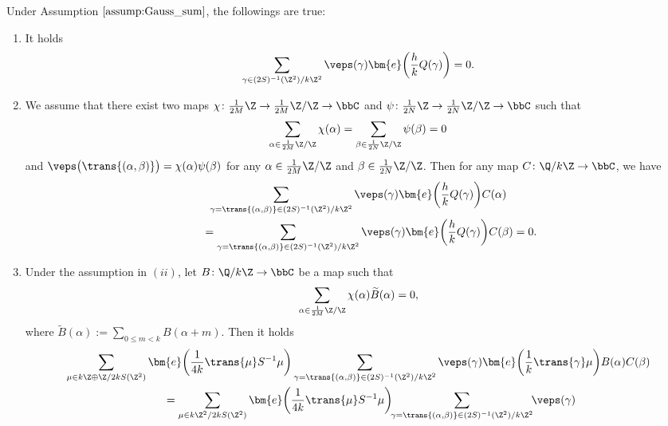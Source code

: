 \begin{prop} \label{prop:Gauss_sum}
	Under Assumption $ \ref{assump:Gauss_sum} $, the followings are true:
	\begin{enumerate}
		\item[$(i)$] %
		It holds
\begin{gather*}
		\sum_{\gamma \in (2S)^{-1}(\Z^2)/k\Z^2} \veps(\gamma)
		\bm{e}\bigg( \frac{h}{k} Q(\gamma) \bigg)
		= 0.
		\end{gather*}
		\item[$(ii)$]%
		We assume that there exist two maps $ \chi \colon \frac{1}{2M}\Z \to \frac{1}{2M}\Z/\Z \to \bbC $ and $ \psi \colon \frac{1}{2N}\Z \to \frac{1}{2N}\Z/\Z \to \bbC $ such that
		\begin{gather*}
		\sum_{\alpha \in \frac{1}{2M}\Z/\Z} \chi(\alpha) 		
		= \sum_{\beta \in \frac{1}{2N}\Z/\Z} \psi(\beta)
		= 0
		\end{gather*}
		and $ \veps\big(\trans{(\alpha, \beta)}\big) = \chi(\alpha) \psi(\beta) $ for any $ \alpha \in \frac{1}{2M}\Z/\Z $ and $ \beta \in \frac{1}{2N}\Z/\Z $.
		Then for any map $ C \colon \Q / k\Z \to \bbC $, we have
		\begin{gather*}
		\sum_{\gamma = \trans{(\alpha, \beta)} \in (2S)^{-1}(\Z^2)/k\Z^2} \veps(\gamma)
		\bm{e}\bigg(\frac{h}{k} Q(\gamma)\bigg) C(\alpha)
\\ \qquad
		{}=
		\sum_{\gamma = \trans{(\alpha, \beta)} \in (2S)^{-1}(\Z^2)/k\Z^2} \veps(\gamma)
		\bm{e}\bigg(\frac{h}{k} Q(\gamma)\bigg) C(\beta)
		= 0.
		\end{gather*}
		\item[$(iii)$] %
		Under the assumption in $(ii)$, let $ B \colon \Q / k\Z \to \bbC $ be a map such that
		\begin{gather*}
		\sum_{\alpha \in \frac{1}{2M}\Z/\Z} \chi(\alpha) \widetilde{B}(\alpha) = 0,
		\end{gather*}
		where $ \widetilde{B}(\alpha) := \sum_{0 \le m < k} B(\alpha + m) $.
		Then it holds
		\begin{gather*}
			\sum_{\mu \in k\Z \oplus \Z/2kS(\Z^2)} \bm{e}\bigg(\frac{1}{4k} {\trans{\mu}} S^{-1} \mu\bigg)
			\sum_{\gamma = \trans{(\alpha, \beta)} \in (2S)^{-1}(\Z^2)/k\Z^2} \veps(\gamma)
			\bm{e}\bigg(\frac{1}{k} {\trans{\gamma}} \mu\bigg) B(\alpha) C(\beta)
\\ \qquad
		{}	=
			\sum_{\mu \in k\Z^2/2kS(\Z^2)} \bm{e}\bigg(\frac{1}{4k} {\trans{\mu}} S^{-1} \mu\bigg)\!\!
			\sum_{\gamma = \trans{(\alpha, \beta)} \in (2S)^{-1}(\Z^2)/k\Z^2}\!\! \veps(\gamma)

\end{gather*}
\end{enumerate}
\end{prop}

